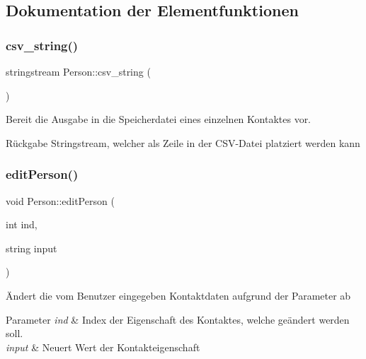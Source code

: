 \subsection{Dokumentation der Elementfunktionen}
\mbox{\label{classContactManager_1_1Person_a3bc1692664e68de81b431caa6a77510b}} 
\subsubsection{\texorpdfstring{csv\+\_\+string()}{csv\_string()}}
{\footnotesize\ttfamily stringstream Person\+::csv\+\_\+string (\begin{DoxyParamCaption}{ }\end{DoxyParamCaption})}



Bereit die Ausgabe in die Speicherdatei eines einzelnen Kontaktes vor.

\begin{DoxyReturn}{Rückgabe}
Stringstream, welcher als Zeile in der C\+S\+V-\/\+Datei platziert werden kann
\end{DoxyReturn}
\mbox{\label{classContactManager_1_1Person_a90d0e64d4db9d19843a343c6f9564555}} 
\subsubsection{\texorpdfstring{edit\+Person()}{editPerson()}}
{\footnotesize\ttfamily void Person\+::edit\+Person (\begin{DoxyParamCaption}\item[{int}]{ind,  }\item[{string}]{input }\end{DoxyParamCaption})}



Ändert die vom Benutzer eingegeben Kontaktdaten aufgrund der Parameter ab


\begin{DoxyParams}{Parameter}
{\em ind} & Index der Eigenschaft des Kontaktes, welche geändert werden soll.\\
\hline
{\em input} & Neuert Wert der Kontakteigenschaft\\
\hline
\end{DoxyParams}
\mbox{\label{classContactManager_1_1Person_ad311ea106906c881d4659d37db460c80}} 
